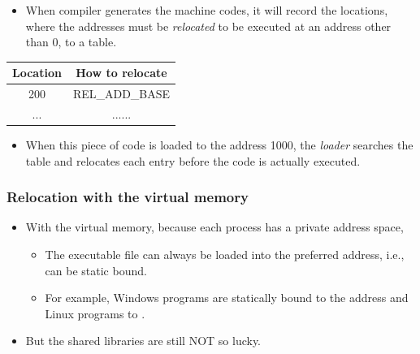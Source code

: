 \documentclass[CJKutf8,xcolor=pdftex,dvipsnames,table]{beamer}
\begin{document}
\begin{CJK*}{UTF8}{song}
\begin{frame}[fragile]
\begin{itemize}
    \item{When compiler generates the machine codes, it will record the locations, where the addresses must be \emph{relocated} to be executed at an address other than 0, to a table.} \pause
    \end{itemize}
    \begin{minipage}[c]{0.5\textwidth}
      \begin{table}
        \centering
        \small
        \begin{tabular}{|c|c|}
          \hline
          Location & How to relocate\\
          \hline\hline
          200 & REL\_ADD\_BASE\\
          ... & ......\\
          \hline
        \end{tabular} \pause
        \normalsize
      \end{table}
    \end{minipage}%
    \begin{minipage}[c]{0.5\textwidth}
      \begin{itemize}
      \item{When this piece of code is loaded to the address 1000, the \emph{loader} searches the table and relocates each entry before the code is actually executed.}
      \end{itemize}
    \end{minipage}
  \end{frame}

  \fi
  
  \begin{frame}
    \frametitle{Relocation with the virtual memory} \pause
    \begin{itemize}
    \item{With the virtual memory, because each process has a private address space,} \pause
      \begin{itemize}
      \item{The executable file can always be loaded into the preferred address, i.e., can be static bound.} \pause
      \item{For example, Windows programs are statically bound to the address  and Linux programs to .} \pause
      \end{itemize}
    \item{But the shared libraries are still NOT so lucky.}
    \end{itemize}
  \end{frame}


\end{CJK*}
\end{document}
